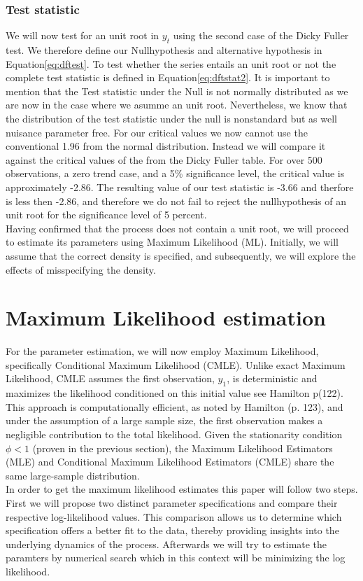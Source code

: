 \documentclass[12pt]{article}
\begin{document}
\subsubsection{Test statistic}
We will now  test for an unit root in $y_t$ using the second case of the Dicky Fuller test. 
We therefore define our Nullhypothesis and alternative hypothesis in Equation\eqref{eq:dftest}.
To test whether the series entails an unit root or not the complete test statistic is defined in Equation\eqref{eq:dftstat2}.
It is important to mention that the Test statistic under the Null is not normally distributed as we are now in the case where we asumme an unit root. Nevertheless, we know that the distribution of the test statistic under the null is nonstandard but as well nuisance parameter free. For our critical values we now cannot use the conventional 1.96 from the normal distribution. Instead we will compare it  against the critical values of the from the Dicky Fuller table.
For over 500 observations, a zero trend case, and a 5\% significance level, the critical value is approximately -2.86.
The resulting value of our test statistic is -3.66 and therfore is less then -2.86, and therefore we do not fail to reject the nullhypothesis of an unit root for the significance level of 5 percent.\\
 Having confirmed that the process does not contain a unit root, we will proceed to estimate its parameters using Maximum Likelihood (ML). Initially, we will assume that the correct density is specified, and subsequently, we will explore the effects of misspecifying the density.

\section{Maximum Likelihood estimation}
For the parameter estimation, we will now employ Maximum Likelihood, specifically Conditional Maximum Likelihood (CMLE). 
Unlike exact Maximum Likelihood, CMLE assumes the first observation, $y_1$, is deterministic and maximizes the likelihood conditioned on this initial value see Hamilton p(122).
This approach is computationally efficient, as noted by Hamilton (p. 123), and under the assumption of a large sample size, the first observation makes a negligible contribution to the total likelihood. 
Given the stationarity condition $\phi < 1$ (proven in the previous section), the Maximum Likelihood Estimators (MLE) and Conditional Maximum Likelihood Estimators (CMLE) share the same large-sample distribution.\\
In order to get the maximum likelihood estimates this paper will follow two steps. First we will propose two distinct parameter specifications and compare their respective log-likelihood values. This comparison allows us to determine which specification offers a better fit to the data, thereby providing insights into the underlying dynamics of the process.
Afterwards we will try to estimate the paramters by numerical search which in this context will be minimizing the log likelihood.
\end{document}
